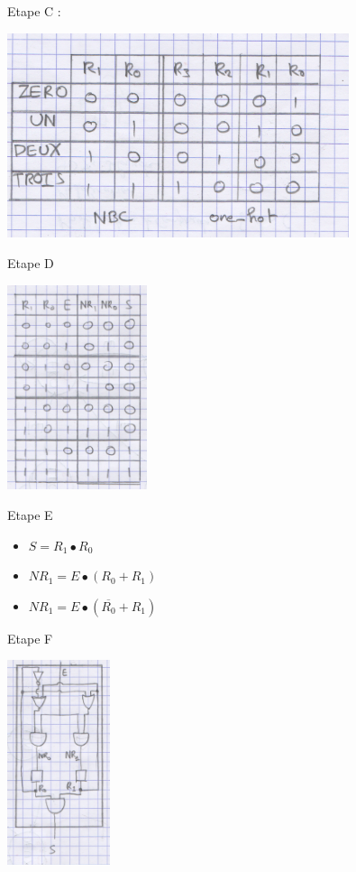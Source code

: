 Etape C :
\begin{center}
  \includegraphics[height=6cm]{cours1/pics/truthtable.png}
\end{center}

Etape D
\begin{center}
  \includegraphics[height=6cm]{cours1/pics/equationtable.png}
\end{center}

Etape E
\begin{itemize}
  \item \(S=R_1 \bullet R_0\)
  \item \(NR_1 = E \bullet {(R_0 + R_1)}\)
  \item \(NR_1 = E \bullet {(\overline{R_0} + R_1)}\)
\end{itemize}

Etape F
\begin{center}
  \includegraphics[height=6cm]{cours1/pics/circuit.png}
\end{center}



